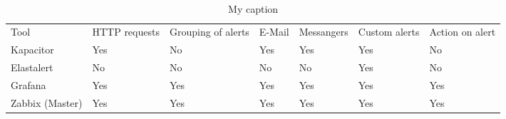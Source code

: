 \\

\begin{table}[]
\centering
\caption{My caption}
\label{my-label}
\begin{tabular}{lllllll}
\cellcolor[HTML]{FFFFFF}Tool & HTTP requests & Grouping of alerts         & E-Mail                      & Messangers                  & Custom alerts & Action on alert \\
Kapacitor                    & Yes           & \cellcolor[HTML]{FFFFFF}No & Yes                         & Yes                         & Yes           & No              \\
Elastalert                   & No            & No                         & \cellcolor[HTML]{FFFFFF}No  & No                          & Yes           & No              \\
Grafana                      & Yes           & Yes                        & \cellcolor[HTML]{FFFFFF}Yes & Yes                         & Yes           & Yes             \\
Zabbix (Master)              & Yes           & Yes                        & Yes                         & \cellcolor[HTML]{FFFFFF}Yes & Yes           & Yes            
\end{tabular}
\end{table}